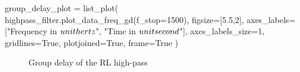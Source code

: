 \begin{sagesilent}
    group_delay_plot = list_plot(
        highpass_filter.plot_data_freq_gd(f_stop=1500),
        figsize=[5.5,2],
        axes_labels=["Frequency in $\\unit{\\hertz}$", "Time in $\\unit{\\second}$"],
        axes_labels_size=1,
        gridlines=True,
        plotjoined=True,
        frame=True
    )
\end{sagesilent}

\begin{figure}[H]
    \centering
    \caption{Group delay of the RL high-pass}
\end{figure}